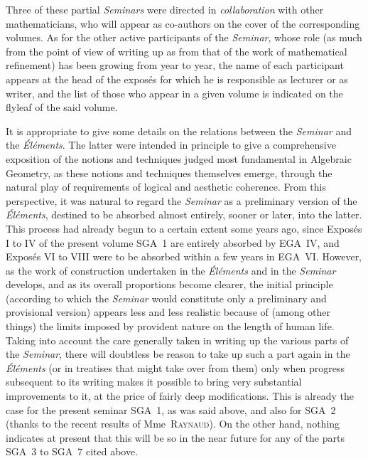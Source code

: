 Three of these partial \emph{Seminars} were directed in
\emph{collaboration} with other mathematicians, who will appear as
co-authors on the cover of the corresponding volumes. As for the other
active participants of the \emph{Seminar}, whose role (as much from the
point of view of writing up as from that of the work of mathematical
refinement) has been growing from year to year, the name of each
participant appears at the head of the expos\'es for which he is
responsible as lecturer or as writer, and the list of those who appear
in a given volume is indicated on the flyleaf of the said volume.

It is appropriate to give some details on the relations between the
\emph{Seminar} and the \emph{\'El\'ements}. The latter were intended in
principle to give a comprehensive exposition of the notions and
techniques judged most fundamental in Algebraic Geometry, as these
notions and techniques themselves emerge, through the natural play of
requirements of logical and aesthetic coherence. From this perspective,
it was natural to regard the \emph{Seminar} as a preliminary version of
the \emph{\'El\'ements}, destined to be absorbed almost entirely, sooner
or later, into the latter. This process had already begun to a certain
extent some years ago, since Expos\'es I to IV of the present volume SGA~1
are entirely absorbed by EGA~IV, and Expos\'es VI to VIII were to be
absorbed within a few years in EGA~VI. However, as the work of
construction undertaken in the \emph{\'El\'ements} and in the
\emph{Seminar} develops, and as its overall proportions become clearer,
the initial principle (according to which the \emph{Seminar} would
constitute only a preliminary and provisional version) appears less and
less realistic because of (among other things) the limits imposed by
provident nature on the length of human life. Taking into account the
care generally taken in writing up the various parts of the
\emph{Seminar}, there will doubtless be reason to take up such a part
again in the \emph{\'El\'ements} (or in treatises that might take over
from them) only when progress subsequent to its writing makes it
possible to bring very substantial improvements to it, at the price of
fairly deep modifications. This is already the case for the present
seminar SGA~1, as was said above, and also for SGA~2 (thanks to the
recent results of Mme~\textsc{Raynaud}). On the other hand, nothing
indicates at present that this will be so in the near future for any of
the parts SGA~3 to SGA~7 cited above.

